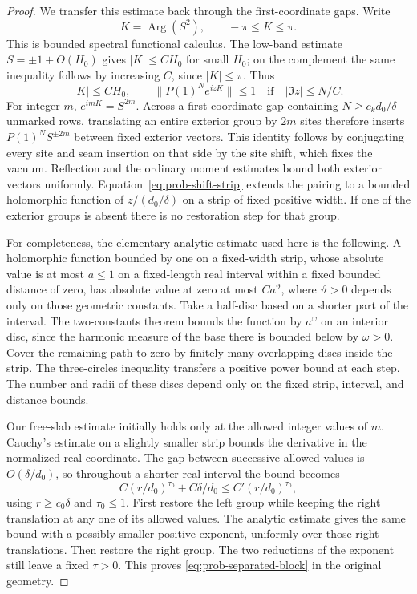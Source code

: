 \begin{proof}
We transfer this estimate back through the first-coordinate gaps.
Write
\[
 K=\operatorname{Arg}(S^2),\qquad -\pi\le K\le\pi.
\]
This is bounded spectral functional calculus. The low-band estimate
\(S=\pm1+O(H_0)\) gives \(|K|\le CH_0\) for small \(H_0\); on the
complement the same inequality follows by increasing \(C\), since
\(|K|\le\pi\). Thus
\begin{equation}\label{eq:prob-shift-strip}
 |K|\le CH_0,
 \qquad
 \|P(1)^N e^{izK}\|\le1
       \quad\text{if}\quad |\Im z|\le N/C.
\end{equation}
For integer \(m\), \(e^{imK}=S^{2m}\).
Across a first-coordinate gap containing \(N\ge c_kd_0/\delta\)
unmarked rows, translating an entire exterior group by \(2m\) sites
therefore inserts \(P(1)^NS^{\pm2m}\) between fixed exterior vectors.
This identity follows by conjugating every site and seam insertion
on that side by the site shift, which fixes the vacuum. Reflection and
the ordinary moment estimates bound both exterior vectors uniformly.
Equation~\eqref{eq:prob-shift-strip} extends the pairing to a bounded
holomorphic function of \(z/(d_0/\delta)\) on a strip of fixed positive
width. If one of the exterior groups is absent there is no restoration
step for that group.

For completeness, the elementary analytic estimate used here is the
following. A holomorphic function bounded by one on a fixed-width strip,
whose absolute value is at most \(a\le1\) on a fixed-length real interval
within a fixed bounded distance of zero, has absolute value at zero at
most \(C a^\vartheta\), where \(\vartheta>0\) depends only on those
geometric constants. Take a half-disc based on a shorter part of the
interval. The two-constants theorem bounds the function by
\(a^{\omega}\) on an interior disc, since the harmonic measure of the
base there is bounded below by \(\omega>0\). Cover the remaining path
to zero by finitely many overlapping discs inside the strip.
The three-circles inequality transfers a positive power bound at each
step. The number and radii of these discs depend only on the fixed
strip, interval, and distance bounds.

Our free-slab estimate initially holds only at the allowed integer
values of \(m\). Cauchy's estimate on a slightly smaller strip bounds
the derivative in the normalized real coordinate. The gap between
successive allowed values is \(O(\delta/d_0)\), so throughout a shorter
real interval the bound becomes
\[
 C(r/d_0)^{\tau_0}+C\delta/d_0
 \le C'(r/d_0)^{\tau_0},
\]
using \(r\ge c_0\delta\) and \(\tau_0\le1\).
First restore the left group while keeping the right translation at
any one of its allowed values. The analytic estimate gives the same
bound with a possibly smaller positive exponent, uniformly over those
right translations. Then restore the right group. The two reductions
of the exponent still leave a fixed \(\tau>0\). This proves
\eqref{eq:prob-separated-block} in the original geometry.
\end{proof}

